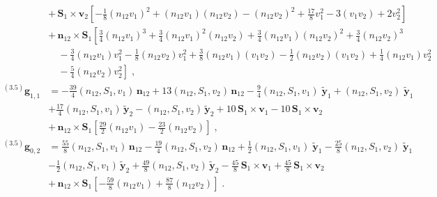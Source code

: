 {\begin{align}
& + \, \mathbf{S}_{1} \times \mathbf{v}_{2} \left[ -\frac{1}{8} (n_{12}v_{1})^2 + (n_{12}v_{1}) (n_{12}v_{2}) -  (n_{12}v_{2})^2 + \frac{17}{8} v_{1}^{2} - 3 (v_{1}v_{2}) + 2 v_{2}^{2} \right] \nonumber \\
& + \, \mathbf{ n}_{12} \times \mathbf{S}_{1} \left[ \frac{3}{4} (n_{12}v_{1})^3 + \frac{3}{4} (n_{12}v_{1})^2 (n_{12}v_{2}) + \frac{3}{4} (n_{12}v_{1}) (n_{12}v_{2})^2 + \frac{3}{4} (n_{12}v_{2})^3 \right. \nonumber \\
& \left. \quad - \frac{3}{4} (n_{12}v_{1}) v_{1}^{2} - \frac{1}{8} (n_{12}v_{2}) v_{1}^{2} + \frac{3}{8} (n_{12}v_{1}) (v_{1}v_{2}) - \frac{1}{2} (n_{12}v_{2}) (v_{1}v_{2}) + \frac{1}{4} (n_{12}v_{1}) v_{2}^{2}  \right. \nonumber \\
& \left. \quad - \frac{5}{4} (n_{12}v_{2}) v_{2}^{2} \right] \;, \nonumber \\
    {}^{(3.5)}\mathbf{g}_{1,1} &= -\frac{39}{4} (n_{12},S_{1},v_{1}) \, \mathbf{n}_{12} + 13 (n_{12},S_{1},v_{2}) \, \mathbf{n}_{12} - \frac{9}{4} (n_{12},S_{1},v_{1}) \; \mathbf{\tilde{y}}_1 +  (n_{12},S_{1},v_{2}) \; \mathbf{\tilde{y}}_1 \nonumber \\
& + \frac{17}{4} (n_{12},S_{1},v_{1}) \, \mathbf{\tilde{y}}_2 - (n_{12},S_{1},v_{2}) \, \mathbf{\tilde{y}}_2 + 10 \, \mathbf{S}_{1} \times \mathbf{v}_{1} - 10 \, \mathbf{S}_{1} \times \mathbf{v}_{2} \nonumber \\
& + \, \mathbf{ n}_{12} \times \mathbf{S}_{1} \left[ \frac{29}{2} (n_{12}v_{1}) - \frac{23}{2} (n_{12}v_{2}) \right] \;,\nonumber \nonumber \\
    {}^{(3.5)}\mathbf{g}_{0,2} &= \frac{55}{8} (n_{12},S_{1},v_{1}) \, \mathbf{n}_{12} - \frac{19}{4} (n_{12},S_{1},v_{2}) \, \mathbf{n}_{12} + \frac{1}{2} (n_{12},S_{1},v_{1}) \; \mathbf{\tilde{y}}_1 - \frac{25}{8} (n_{12},S_{1},v_{2}) \; \mathbf{\tilde{y}}_1 \nonumber \\
& - \frac{1}{2} (n_{12},S_{1},v_{1}) \, \mathbf{\tilde{y}}_2 + \frac{49}{8} (n_{12},S_{1},v_{2}) \, \mathbf{\tilde{y}}_2 - \frac{45}{8} \, \mathbf{S}_{1} \times \mathbf{v}_{1} + \frac{45}{8} \, \mathbf{S}_{1} \times \mathbf{v}_{2} \nonumber \\
& + \, \mathbf{ n}_{12} \times \mathbf{S}_{1} \left[ -\frac{59}{8} (n_{12}v_{1}) + \frac{87}{8} (n_{12}v_{2}) \right] \;.
\end{align}}
